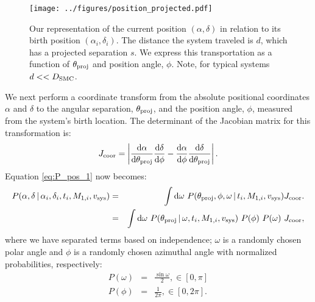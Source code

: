 \documentclass[12pt, preprint]{aastex}
\newcommand{\given}{\,|\,}
\newcommand{\dd}{\mathrm{d}}
\begin{document}
\begin{figure}[h!]
\begin{center}
\texttt{[image: ../figures/position\_projected.pdf]}
\caption{Our representation of the current position $(\alpha, \delta)$ in relation to its birth position $(\alpha_i, \delta_i)$. The distance the system traveled is $d$, which has a projected separation $s$. We express this transportation as a function of $\theta_{\rm proj}$ and position angle, $\phi$. Note, for typical systems $d << D_{\rm SMC}$.}
\label{fig:position_projection}
\end{center}
\end{figure}


We next perform a coordinate transform from the absolute positional coordinates $\alpha$ and $\delta$ to the angular separation, $\theta_{\rm proj}$, and the position angle, $\phi$, measured from the system's birth location. The determinant of the Jacobian matrix for this transformation is:
\begin{equation}
J_{\rm coor} = \left| \frac{\dd \alpha}{\dd \theta_{\rm proj}} \frac{\dd \delta}{\dd \phi} - \frac{\dd \alpha}{\dd \phi} \frac{\dd \delta}{\dd \theta_{\rm proj}} \right|.
\end{equation}
Equation \ref{eq:P_pos_1} now becomes:
\begin{eqnarray}
P(\alpha, \delta \given \alpha_i, \delta_i, t_i, M_{1,i}, v_{\rm sys} ) &=& \int \dd \omega\ P(\theta_{\rm proj}, \phi, \omega \given t_i, M_{1,i}, v_{\rm sys} ) J_{\rm coor}. \nonumber \\
&=& \int \dd \omega\ P(\theta_{\rm proj} \given \omega,  t_i, M_{1,i}, v_{\rm sys} )\ P(\phi)\ P(\omega)\ J_{\rm coor}, \label{eq:P_pos_2}
\end{eqnarray}
where we have separated terms based on independence; $\omega$ is a randomly chosen polar angle and $\phi$ is a randomly chosen azimuthal angle with normalized probabilities, respectively: 
\begin{eqnarray}
P(\omega) &=& \frac{\sin \omega} {2}, \in [0,\pi] \\
P(\phi) &=& \frac{1}{2 \pi}, \in [0, 2\pi].
\end{eqnarray}
\end{document}
